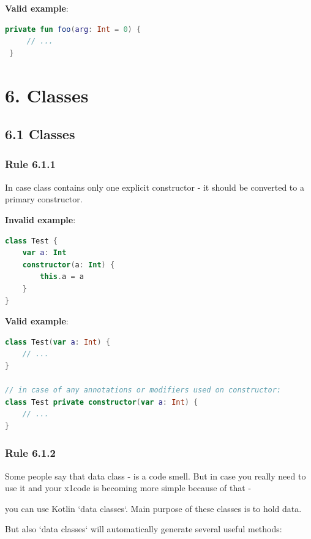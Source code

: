 {{{{\textbf{Valid example}:

\begin{lstlisting}[language=Kotlin]
 private fun foo(arg: Int = 0) {
     // ...
 }
\end{lstlisting}
\section*{\textbf{6. Classes}}

\subsection*{\textbf{6.1 Classes}}

\subsubsection*{\textbf{Rule 6.1.1}}
\leavevmode\newline

In case class contains only one explicit constructor - it should be converted to a primary constructor.



\textbf{Invalid example}:

\begin{lstlisting}[language=Kotlin]
class Test {
    var a: Int
    constructor(a: Int) {
        this.a = a
    }
}
\end{lstlisting}


\textbf{Valid example}:

\begin{lstlisting}[language=Kotlin]
class Test(var a: Int) {
    // ...
}

// in case of any annotations or modifiers used on constructor:
class Test private constructor(var a: Int) {
    // ...
}
\end{lstlisting}


\subsubsection*{\textbf{Rule 6.1.2}}
\leavevmode\newline

Some people say that data class - is a code smell. But in case you really need to use it and your x1code is becoming more simple because of that -

you can use Kotlin `data classes`. Main purpose of these classes is to hold data.

But also `data classes` will automatically generate several useful methods:

}}}}
